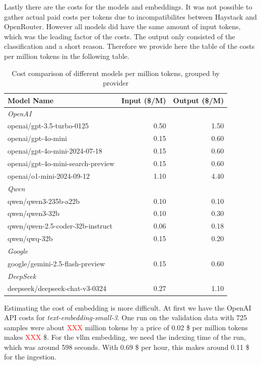 Lastly there are the costs for the models and embeddings. It was not possible to gather actual paid costs per tokens due to incompatibilites between Haystack and OpenRouter. However all models did have the same amount of input tokens, which was the leading factor of the costs. The output only consisted of the classification and a short reason. Therefore we provide here the table of the costs per million tokens in the following table.

\begin{table}[!ht]
    \centering
    \caption{Cost comparison of different models per million tokens, grouped by provider}
    \label{tab:model_costs}
    \begin{tabular}{lrr}
        \hline
        \textbf{Model Name} & \textbf{Input (\$/M)} & \textbf{Output (\$/M)} \\
        \hline
        \multicolumn{3}{l}{\textit{OpenAI}} \\
        openai/gpt-3.5-turbo-0125 & 0.50 & 1.50 \\
        openai/gpt-4o-mini & 0.15 & 0.60 \\
        openai/gpt-4o-mini-2024-07-18 & 0.15 & 0.60 \\
        openai/gpt-4o-mini-search-preview & 0.15 & 0.60 \\
        openai/o1-mini-2024-09-12 & 1.10 & 4.40 \\
        \hline
        \multicolumn{3}{l}{\textit{Qwen}} \\
        qwen/qwen3-235b-a22b & 0.10 & 0.10 \\
        qwen/qwen3-32b & 0.10 & 0.30 \\
        qwen/qwen-2.5-coder-32b-instruct & 0.06 & 0.18 \\
        qwen/qwq-32b & 0.15 & 0.20 \\
        \hline
        \multicolumn{3}{l}{\textit{Google}} \\
        google/gemini-2.5-flash-preview & 0.15 & 0.60 \\
        \hline
        \multicolumn{3}{l}{\textit{DeepSeek}} \\
        deepseek/deepseek-chat-v3-0324 & 0.27 & 1.10 \\
        \hline
    \end{tabular}
\end{table}

Estimating the cost of embedding is more difficult. At first we have the OpenAI API costs for \textit{text-embedding-small-3}. One run on the validation data with 725 samples were about \textcolor{red}{XXX} million tokens by a price of 0.02 \$ per million tokens makes \textcolor{red}{XXX} \$. For the vllm embedding, we need the indexing time of the run, which was around 598 seconds. With 0.69 \$ per hour, this makes around 0.11 \$ for the ingestion. 

